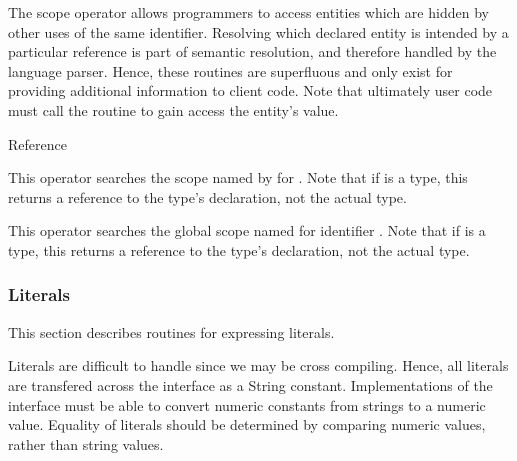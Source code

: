 The scope operator allows programmers to access entities which are
hidden by other uses of the same identifier.  Resolving which
declared entity is intended by a particular reference is part of semantic
resolution, and therefore handled by the language parser.  Hence,
these routines are superfluous and only exist for providing additional
information to client code.  Note that ultimately user code must call the
 routine to gain access the entity's value.

	{}{Reference}
\begin{functionality}
This operator searches the scope named by  for
.  Note that if  is a type, this returns a
reference to the type's declaration, not the actual type.
\end{functionality}

\begin{functionality}
This operator searches the global scope named for identifier .
Note that if  is a type, this returns a
reference to the type's declaration, not the actual type.
\end{functionality}

\subsubsection{Literals}
This section describes routines for expressing literals.  

\begin{functionality}
Literals are difficult to handle since we may be cross compiling.
Hence, all literals are transfered across the interface as a String
constant.  Implementations of the interface must be able to convert
numeric constants from strings to a numeric value.  Equality of
literals should be determined by comparing numeric values, rather than
string values.
\end{functionality}


